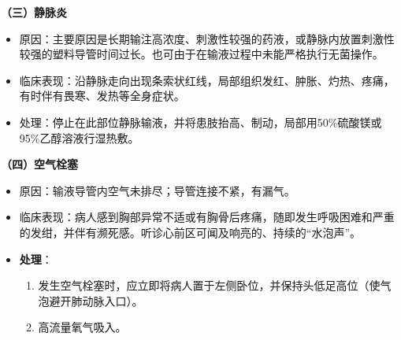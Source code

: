\documentclass[11pt, a4paper]{ctexart}
\begin{document}
\textbf{（三）静脉炎}
\begin{itemize}
	\item 原因：主要原因是长期输注高浓度、刺激性较强的药液，或静脉内放置刺激性较强的塑料导管时间过长。也可由于在输液过程中未能严格执行无菌操作。
	\item 临床表现：沿静脉走向出现条索状红线，局部组织发红、肿胀、灼热、疼痛，有时伴有畏寒、发热等全身症状。
	\item 处理：停止在此部位静脉输液，并将患肢抬高、制动，局部用50\%硫酸镁或95\%乙醇溶液行湿热敷。
\end{itemize}

\textbf{（四）空气栓塞}
\begin{itemize}
	\item 原因：输液导管内空气未排尽；导管连接不紧，有漏气。
	\item 临床表现：病人感到胸部异常不适或有胸骨后疼痛，随即发生呼吸困难和严重的发绀，并伴有濒死感。听诊心前区可闻及响亮的、持续的“水泡声”。
	\item \textbf{处理}：
	      \begin{enumerate}
		      \item 发生空气栓塞时，应立即将病人置于左侧卧位，并保持头低足高位（使气泡避开肺动脉入口）。
		      \item 高流量氧气吸入。
	      \end{enumerate}
\end{itemize}
\end{document}
